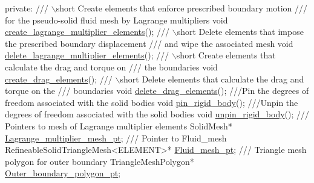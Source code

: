 \begin{DoxyCodeInclude}
\textcolor{keyword}{private}:
 \textcolor{comment}{}
\textcolor{comment}{ /// \(\backslash\)short Create elements that enforce prescribed boundary motion}
\textcolor{comment}{ /// for the pseudo-solid fluid mesh by Lagrange multipliers}
\textcolor{comment}{} \textcolor{keywordtype}{void} \hyperlink{classUnstructuredImmersedEllipseProblem_a3b4a4e279a11b37d79d040b348008765}{create\_lagrange\_multiplier\_elements}();
\textcolor{comment}{}
\textcolor{comment}{ /// \(\backslash\)short Delete elements that impose the prescribed boundary displacement}
\textcolor{comment}{ /// and wipe the associated mesh}
\textcolor{comment}{} \textcolor{keywordtype}{void} \hyperlink{classUnstructuredImmersedEllipseProblem_a51555f77dc360c94591ee68c3fc9928a}{delete\_lagrange\_multiplier\_elements}();
\textcolor{comment}{}
\textcolor{comment}{ /// \(\backslash\)short Create elements that calculate the drag and torque on}
\textcolor{comment}{ /// the boundaries}
\textcolor{comment}{} \textcolor{keywordtype}{void} \hyperlink{classUnstructuredImmersedEllipseProblem_a16a7c6022867f709ebdd59b8fee2004a}{create\_drag\_elements}();
 \textcolor{comment}{}
\textcolor{comment}{ /// \(\backslash\)short Delete elements that calculate the drag and torque on the }
\textcolor{comment}{ /// boundaries}
\textcolor{comment}{} \textcolor{keywordtype}{void} \hyperlink{classUnstructuredImmersedEllipseProblem_a7d7b84968988d37091b29957b0af5bfa}{delete\_drag\_elements}();
\textcolor{comment}{}
\textcolor{comment}{ ///Pin the degrees of freedom associated with the solid bodies}
\textcolor{comment}{} \textcolor{keywordtype}{void} \hyperlink{classUnstructuredImmersedEllipseProblem_a07dc16909c0223fe4b656fd270f27c11}{pin\_rigid\_body}();
\textcolor{comment}{}
\textcolor{comment}{ ///Unpin the degrees of freedom associated with the solid bodies}
\textcolor{comment}{} \textcolor{keywordtype}{void} \hyperlink{classUnstructuredImmersedEllipseProblem_a4f8c7e7e4d626084f6515a152b165567}{unpin\_rigid\_body}();
 \textcolor{comment}{}
\textcolor{comment}{ /// Pointers to mesh of Lagrange multiplier elements}
\textcolor{comment}{} SolidMesh* \hyperlink{classUnstructuredImmersedEllipseProblem_ad644e67ccd6ab0811c5fe2b7b944fbca}{Lagrange\_multiplier\_mesh\_pt};
\textcolor{comment}{}
\textcolor{comment}{ /// Pointer to Fluid\_mesh}
\textcolor{comment}{} RefineableSolidTriangleMesh<ELEMENT>* \hyperlink{classUnstructuredImmersedEllipseProblem_a0ba79ccde26b781b66d9839460f08bd3}{Fluid\_mesh\_pt};
 \textcolor{comment}{}
\textcolor{comment}{ /// Triangle mesh polygon for outer boundary }
\textcolor{comment}{} TriangleMeshPolygon* \hyperlink{classUnstructuredImmersedEllipseProblem_ae0b35188432c371804887b6de86b48c7}{Outer\_boundary\_polygon\_pt};

\end{DoxyCodeInclude}

